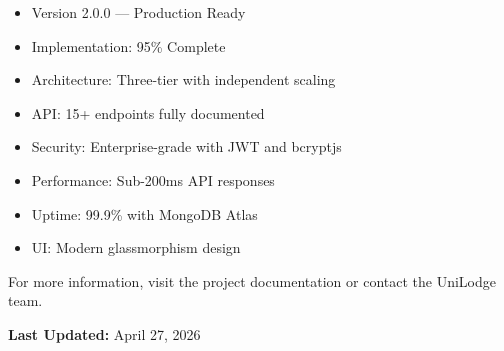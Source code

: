 \documentclass[12pt, a4paper, oneside]{report}
\begin{document}
\begin{tcolorbox}[success, title=Project Status]
\begin{itemize}
  \item Version 2.0.0 — Production Ready
  \item Implementation: 95\% Complete
  \item Architecture: Three-tier with independent scaling
  \item API: 15+ endpoints fully documented
  \item Security: Enterprise-grade with JWT and bcryptjs
  \item Performance: Sub-200ms API responses
  \item Uptime: 99.9\% with MongoDB Atlas
  \item UI: Modern glassmorphism design
\end{itemize}
\end{tcolorbox}

\vspace{1cm}

\begin{tcolorbox}[info, title=Contact and Support]
For more information, visit the project documentation or contact the UniLodge team.

\noindent \textbf{Last Updated:} April 27, 2026
\end{tcolorbox}
\end{document}
